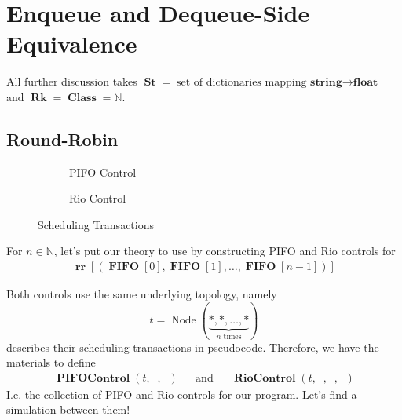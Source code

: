 \documentclass{amsart}
\DeclareMathOperator{\Rk}{\mathbf{Rk}}
\DeclareMathOperator{\Node}{\mathrm{Node}}
\DeclareMathOperator{\St}{\mathbf{St}}
\DeclareMathOperator{\RR}{\mathbf{rr}}     %
\DeclareMathOperator{\Class}{\mathbf{Class}}
\DeclareMathOperator{\FIFO}{\mathbf{FIFO}}
\DeclareMathOperator{\PIFOControl}{\mathbf{PIFOControl}}
\DeclareMathOperator{\RioControl}{\mathbf{RioControl}}
\DeclareMathOperator{\zprepush}{z_{\mathrm{pre-push}}}
\DeclareMathOperator{\zpostpop}{z_{\mathrm{post-pop}}}
\DeclareMathOperator{\tzprepush}{z^{\prime}_{\mathrm{pre-push}}}
\DeclareMathOperator{\tzprepop}{z^{\prime}_{\mathrm{pre-pop}}}
\DeclareMathOperator{\tzpostpop}{z^{\prime}_{\mathrm{post-pop}}}
\theoremstyle{definition}
\begin{document}
\newpage

\section{Enqueue and Dequeue-Side Equivalence}

All further discussion takes $\St = \text{set of dictionaries mapping $\textbf{string} \to \textbf{float}$}$ and $\Rk = \Class = \mathbb N$.

\subsection{Round-Robin}

\begin{figure}[!htb]
    \centering
    \begin{subfigure}[t]{0.49\linewidth}
        
        
        \caption{PIFO Control}
    \end{subfigure}
    \begin{subfigure}[t]{0.49\linewidth}
        
        
        
        \caption{Rio Control}
    \end{subfigure}
    \caption{Scheduling Transactions}
    \label{fig:sched_trans}
\end{figure}

For $n \in \mathbb N$, let's put our theory to use by constructing PIFO and Rio controls for
\begin{align*}
    \RR[(\FIFO[0], \FIFO[1], \ldots, \FIFO[n - 1])] 
\end{align*}

Both controls use the same underlying topology, namely
$$
t = \Node(\underbrace{\ast, \ast, \ldots, \ast}_{n \text{ times}})
$$
 describes their scheduling transactions in pseudocode.
Therefore, we have the materials to define
\begin{align*}
    \PIFOControl(t, \zprepush, \zpostpop)
    &&
    \text{and}
    &&
    \RioControl(t, \tzprepush, \tzprepop, \tzpostpop)
\end{align*}
I.e. the collection of PIFO and Rio controls for our program.
Let's find a simulation between them!

\newpage

\renewcommand\refname{\LARGE References}


\end{document}
